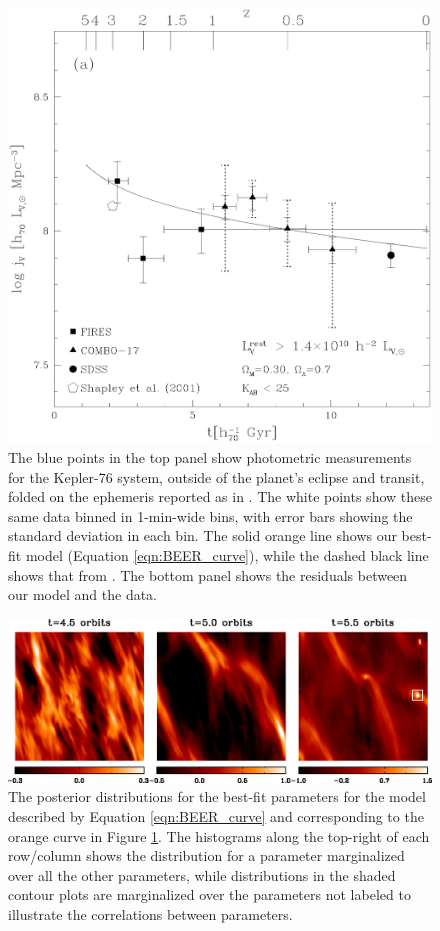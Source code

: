 \documentclass[manuscript]{aastex62}
\begin{document}
\begin{figure}
\includegraphics[width=\textwidth]{f2.eps}
\caption{The blue points in the top panel show photometric measurements for the Kepler-76 system, outside of the planet's eclipse and transit, folded on the ephemeris reported as in \citet{2013ApJ...771...26F}. The white points show these same data binned in 1-min-wide bins, with error bars showing the standard deviation in each bin. The solid orange line shows our best-fit model (Equation \ref{eqn:BEER_curve}), while the dashed black line shows that from \citet{2013ApJ...771...26F}. The bottom panel shows the residuals between our model and the data.\label{fig:BEER-curve-fit_Analysis_of_Kepler76b}}
\end{figure}

\begin{figure}
\includegraphics[width=\textwidth]{f3.eps}
\caption{The posterior distributions for the best-fit parameters for the model described by Equation \ref{eqn:BEER_curve} and corresponding to the orange curve in Figure \ref{fig:BEER-curve-fit_Analysis_of_Kepler76b}. The histograms along the top-right of each row/column shows the distribution for a parameter marginalized over all the other parameters, while distributions in the shaded contour plots are marginalized over the parameters not labeled to illustrate the correlations between parameters. \label{fig:BEER-curve-fit-params_Analysis-of-Kepler76b}}
\end{figure}
\end{document}
